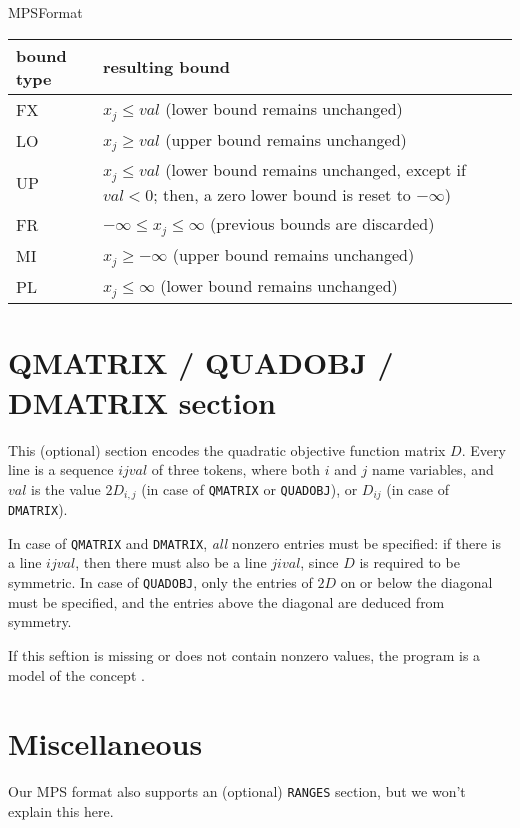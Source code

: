 \begin{ccRefConcept}{MPSFormat}
\begin{tabular}{l|l}
bound type & resulting bound \\ \hline
FX & $x_j \leq val$ (lower bound remains unchanged) \\
LO & $x_j \geq val$ (upper bound remains unchanged) \\
UP & $x_j \leq val$ (lower bound remains unchanged, except if $val<0$; then, 
a zero lower bound is reset to $-\infty$)\\
FR & $-\infty \leq x_j\leq\infty$ (previous bounds are discarded)\\
MI & $x_j\geq -\infty$ (upper bound remains unchanged)\\
PL & $x_j\leq \infty$ (lower bound remains unchanged)    
\end{tabular}

\section*{QMATRIX / QUADOBJ / DMATRIX section}
This (optional) section encodes the quadratic objective
function matrix $D$. Every line is a sequence $i j val$ of
three tokens, where both $i$ and $j$ name variables, and
$val$ is the value $2D_{i,j}$ (in case of \texttt{QMATRIX}
or \texttt{QUADOBJ}), or $D_{ij}$ (in case of \texttt{DMATRIX}).

In case of \texttt{QMATRIX} and \texttt{DMATRIX}, \emph{all} nonzero
entries must be specified: if there is a line $i j val$, then there
must also be a line $j i val$, since $D$ is required to be symmetric.
In case of \texttt{QUADOBJ}, only the entries of $2D$ on or below the
diagonal must be specified, and the entries above the diagonal are
deduced from symmetry.

If this seftion is missing or does not contain nonzero values, the
program is a model of the concept .

\section*{Miscellaneous}
Our MPS format also supports an (optional) \texttt{RANGES} section,
but we won't explain this here.


\end{ccRefConcept}
